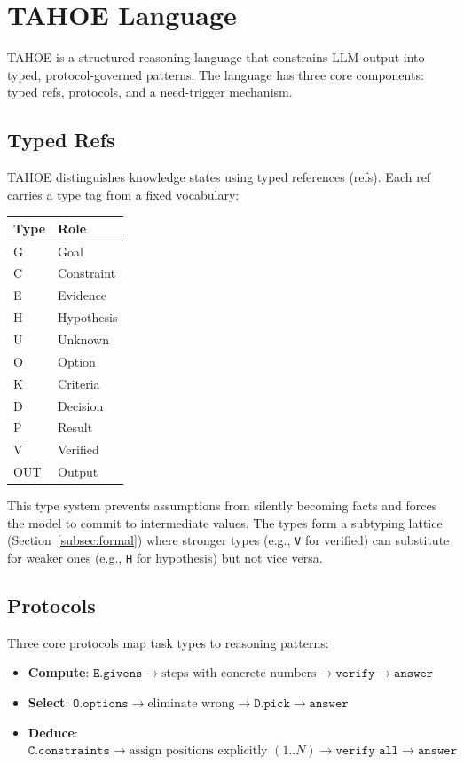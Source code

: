 \documentclass[11pt,a4paper]{article}
\begin{document}
\section{TAHOE Language}
\label{sec:language}

TAHOE is a structured reasoning language that constrains LLM output into typed, protocol-governed patterns.
The language has three core components: typed refs, protocols, and a need-trigger mechanism.

\subsection{Typed Refs}
\label{subsec:typed-refs}

TAHOE distinguishes knowledge states using typed references (refs).
Each ref carries a type tag from a fixed vocabulary:

\begin{center}
\begin{tabular}{ll}
\toprule
\textbf{Type} & \textbf{Role} \\
\midrule
G & Goal \\
C & Constraint \\
E & Evidence \\
H & Hypothesis \\
U & Unknown \\
O & Option \\
K & Criteria \\
D & Decision \\
P & Result \\
V & Verified \\
OUT & Output \\
\bottomrule
\end{tabular}
\end{center}

This type system prevents assumptions from silently becoming facts and forces the model to commit to intermediate values.
The types form a subtyping lattice (Section~\ref{subsec:formal}) where stronger types (e.g., \texttt{V} for verified) can substitute for weaker ones (e.g., \texttt{H} for hypothesis) but not vice versa.

\subsection{Protocols}
\label{subsec:protocols}

Three core protocols map task types to reasoning patterns:

\begin{itemize}[nosep,leftmargin=*]
    \item \textbf{Compute}: $\texttt{E.givens} \to \text{steps with concrete numbers} \to \texttt{verify} \to \texttt{answer}$
    \item \textbf{Select}: $\texttt{O.options} \to \text{eliminate wrong} \to \texttt{D.pick} \to \texttt{answer}$
    \item \textbf{Deduce}: $\texttt{C.constraints} \to \text{assign positions explicitly } (1..N) \to \texttt{verify all} \to \texttt{answer}$
\end{itemize}
\end{document}
